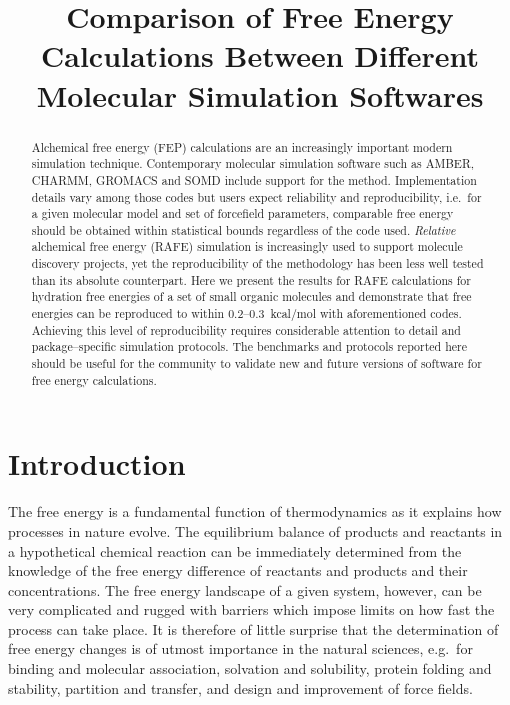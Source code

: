\documentclass[journal=jctcce,manuscript=article]{achemso}
\title{\color{red}Comparison of Free Energy Calculations Between Different Molecular Simulation Softwares}
\begin{document}
\begin{abstract}
  Alchemical free energy (FEP) calculations are an increasingly
  important modern simulation technique.  Contemporary molecular
  simulation software such as AMBER, CHARMM, GROMACS and SOMD include
  support for the method.  Implementation details vary among those
  codes but users expect reliability and reproducibility, i.e.\ for a
  given molecular model and set of forcefield parameters, comparable
  free energy should be obtained within statistical bounds regardless
  of the code used.  \emph{Relative} alchemical free energy (RAFE)
  simulation is increasingly used to support molecule discovery
  projects, yet the reproducibility of the methodology has been less
  well tested than its absolute counterpart.  Here we present the
  results for RAFE calculations for hydration free energies of a set
  of small organic molecules and demonstrate that free energies can be
  reproduced to within 0.2--\SI{0.3}{kcal/mol} with aforementioned
  codes.  Achieving this level of reproducibility requires considerable
  attention to detail and package--specific simulation protocols. The
  benchmarks and protocols reported here should be useful for the
  community to validate new and future versions of software for free
  energy calculations.
\end{abstract}

\begin{tocentry}
\end{tocentry}

\section{Introduction}
\label{sec:intro}

The free energy is a fundamental function of thermodynamics as it explains
how processes in nature evolve.  The equilibrium balance of products and reactants in a hypothetical chemical reaction can be immediately determined
from the knowledge of the free energy difference of reactants and
products and their concentrations.  The free energy landscape of a given
system, however, can be very complicated and rugged with barriers which impose
limits on how fast the process can take place.  It is therefore of
little surprise that the determination of free energy changes is of
utmost importance in the natural sciences, e.g.\ for binding and
molecular association, solvation and solubility, protein folding and
stability, partition and transfer, and design and improvement of force
fields.
\end{document}

